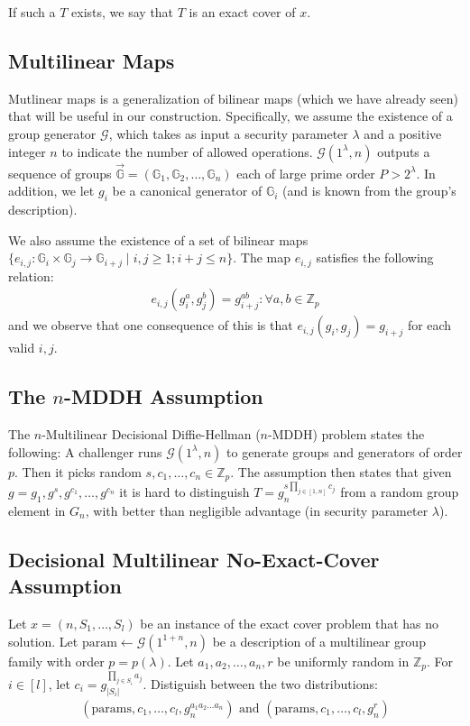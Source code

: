 \documentclass[12pt]{tufte-book}
\begin{document}
If such a $T$ exists, we say that $T$ is an exact cover of $x$.

\subsection{Multilinear Maps}

Mutlinear maps is a generalization of bilinear maps (which we have already seen) that will be useful in our construction. Specifically, we assume the existence of a group generator $\mathcal{G}$, which takes as input a security parameter $\lambda$ and a positive integer $n$ to indicate the number of allowed operations. $\mathcal{G}(1^{\lambda},n)$ outputs a sequence of groups $\vec{\mathbb{G}}= (\mathbb{G}_1, \mathbb{G}_2, \ldots, \mathbb{G}_n)$  each of large prime order $P > 2^{\lambda}$. In addition, we let $g_i$ be a canonical generator of $\mathbb{G}_i$  (and is known from the group's description).

We also assume the existence of a set of bilinear maps $\{e_{i,j}: \mathbb{G}_i \times \mathbb{G}_j \rightarrow \mathbb{G}_{i+j} \mid i, j \ge 1; i+j \le n \}.$ The map $e_{i,j}$ satisfies the following relation:
\begin{align}
e_{i,j}\left(g_i^{a},g_j^{b}\right) = g^{ab}_{i+j}: \forall a,b \in \mathbb{Z}_p \label{vasikoni}
\end{align}
and we observe that one consequence of this is that $e_{i,j} (g_i, g_j) = g_{i+j}$ for each valid $i,j$.

\subsection{The $n$-MDDH Assumption  }

The $n$-Multilinear Decisional Diffie-Hellman ($n$-MDDH) problem states the following: A challenger runs $\mathcal{G}(1^{\lambda},n ) $ to generate groups and generators of order $p$. Then it picks random $s, c_1, \ldots, c_n  \in \mathbb{Z}_p$.  The assumption then states that given $g= g_1, g^{s}, g^{c_1}, \ldots,g^{c_n}$ it is hard to distinguish $T = g_n^{s \prod_{j \in [1,n ] } c_j}$ from a random group element in $G_n$, with better than negligible advantage (in security parameter $\lambda$).

\newpage


\subsection{Decisional Multilinear  No-Exact-Cover  Assumption}
Let $x = (n, S_1, \ldots, S_l)$ be an instance of the exact cover problem that has no solution. Let $\mathrm{param} \leftarrow \mathcal{G}(1^{1+n},n)$ be a description of a multilinear group family with order $p = p(\lambda)$. Let $a_1, a_2, \ldots, a_n,r$ be uniformly random in $\mathbb{Z}_p$. For $i \in [l]$, let $c_i  = g_{|S_i|}^{ \prod_{j \in S_i} a_j}$. Distiguish between the two distributions:
\begin{align*}
(\mathrm{params}, c_1, \ldots,c_l,g_n^{a_1a_2\ldots a_n}) \text{ and } (\mathrm{params},c_1, \ldots,c_l,g_n^r)
\end{align*}
\end{document}
